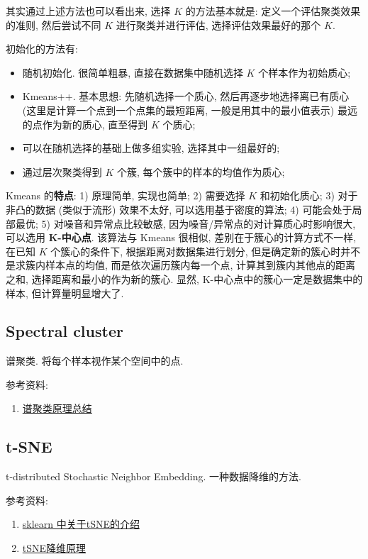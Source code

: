 其实通过上述方法也可以看出来, 选择 $K$ 的方法基本就是: 定义一个评估聚类效果的准则, 然后尝试不同 $K$ 进行聚类并进行评估, 选择评估效果最好的那个 $K$.


初始化的方法有:
\begin{itemize}
	\item 随机初始化. 很简单粗暴, 直接在数据集中随机选择 $K$ 个样本作为初始质心;
	
	\item Kmeans++. 基本思想: 先随机选择一个质心, 然后再逐步地选择离已有质心 (这里是计算一个点到一个点集的最短距离, 一般是用其中的最小值表示) 最远的点作为新的质心, 直至得到 $K$ 个质心;
	
	\item 可以在随机选择的基础上做多组实验, 选择其中一组最好的;
	
	\item 通过层次聚类得到 $K$ 个簇, 每个簇中的样本的均值作为质心;
\end{itemize}

Kmeans 的\textbf{特点}: 1) 原理简单, 实现也简单; 2) 需要选择 $K$ 和初始化质心; 3) 对于非凸的数据 (类似于流形) 效果不太好, 可以选用基于密度的算法; 4) 可能会处于局部最优; 5) 对噪音和异常点比较敏感, 因为噪音/异常点的对计算质心时影响很大, 可以选用 \textbf{K-中心点}. 该算法与 Kmeans 很相似, 差别在于簇心的计算方式不一样, 在已知 $K$ 个簇心的条件下, 根据距离对数据集进行划分, 但是确定新的簇心时并不是求簇内样本点的均值, 而是依次遍历簇内每一个点, 计算其到簇内其他点的距离之和, 选择距离和最小的作为新的簇心. 显然, K-中心点中的簇心一定是数据集中的样本, 但计算量明显增大了.

\subsection{Spectral cluster}
谱聚类. 将每个样本视作某个空间中的点. 

参考资料: 
\begin{enumerate}
	\item \href{https://www.cnblogs.com/pinard/p/6221564.htm}{谱聚类原理总结}
\end{enumerate}

\subsection{t-SNE}
t-distributed Stochastic Neighbor Embedding. 一种数据降维的方法. 

参考资料: 
\begin{enumerate}
	\item \href{https://scikit-learn.org/stable/modules/manifold.html#t-distributed-stochastic-neighbor-embedding-t-sne}{sklearn 中关于tSNE的介绍}
	\item \href{https://www.jianshu.com/p/700f017cd330}{tSNE降维原理}
\end{enumerate}

